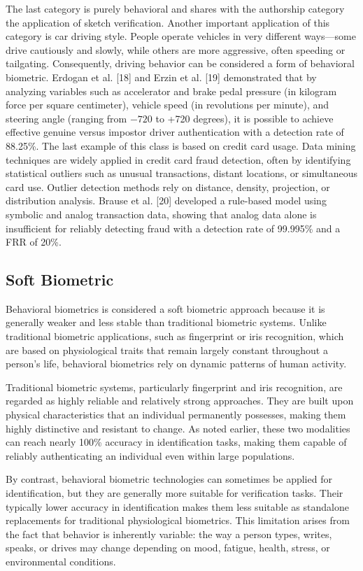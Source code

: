 \documentclass{article}
\begin{document}
The last category is purely behavioral and shares with the authorship category the application of sketch verification.
Another important application of this category is car driving style.
People operate vehicles in very different ways—some drive cautiously and slowly, while others are more aggressive, often speeding or tailgating. 
Consequently, driving behavior can be considered a form of behavioral biometric. 
Erdogan et al. [18] and Erzin et al. [19] demonstrated that by analyzing variables such as accelerator and brake pedal pressure (in kilogram force per square centimeter), vehicle speed (in revolutions per minute), and steering angle (ranging from \(-720\) to +720 degrees), it is possible to achieve effective genuine versus impostor driver authentication with a detection rate of 88.25\%.
The last example of this class is based on credit card usage.
Data mining techniques are widely applied in credit card fraud detection, often by identifying statistical outliers such as unusual transactions, distant locations, or simultaneous card use. 
Outlier detection methods rely on distance, density, projection, or distribution analysis. 
Brause et al. [20] developed a rule-based model using symbolic and analog transaction data, showing that analog data alone is insufficient for reliably detecting fraud with a detection rate of 99.995\% and a FRR of 20\%.

\subsection{Soft Biometric}

Behavioral biometrics is considered a soft biometric approach because it is generally weaker and less stable than traditional biometric systems. 
Unlike traditional biometric applications, such as fingerprint or iris recognition, which are based on physiological traits that remain largely constant throughout a person's life, behavioral biometrics rely on dynamic patterns of human activity.

Traditional biometric systems, particularly fingerprint and iris recognition, are regarded as highly reliable and relatively strong approaches. 
They are built upon physical characteristics that an individual permanently possesses, making them highly distinctive and resistant to change. 
As noted earlier, these two modalities can reach nearly 100\% accuracy in identification tasks, making them capable of reliably authenticating an individual even within large populations.

By contrast, behavioral biometric technologies can sometimes be applied for identification, but they are generally more suitable for verification tasks. 
Their typically lower accuracy in identification makes them less suitable as standalone replacements for traditional physiological biometrics. 
This limitation arises from the fact that behavior is inherently variable: the way a person types, writes, speaks, or drives may change depending on mood, fatigue, health, stress, or environmental conditions.
\end{document}
